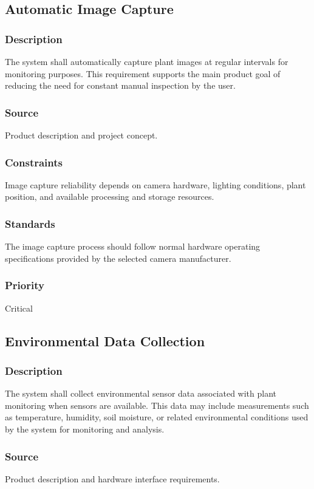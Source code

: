 \subsection{Automatic Image Capture}
\subsubsection{Description}
The system shall automatically capture plant images at regular intervals for monitoring purposes. This requirement supports the main product goal of reducing the need for constant manual inspection by the user.

\subsubsection{Source}
Product description and project concept.

\subsubsection{Constraints}
Image capture reliability depends on camera hardware, lighting conditions, plant position, and available processing and storage resources.

\subsubsection{Standards}
The image capture process should follow normal hardware operating specifications provided by the selected camera manufacturer.

\subsubsection{Priority}
Critical

\subsection{Environmental Data Collection}
\subsubsection{Description}
The system shall collect environmental sensor data associated with plant monitoring when sensors are available. This data may include measurements such as temperature, humidity, soil moisture, or related environmental conditions used by the system for monitoring and analysis.

\subsubsection{Source}
Product description and hardware interface requirements.

